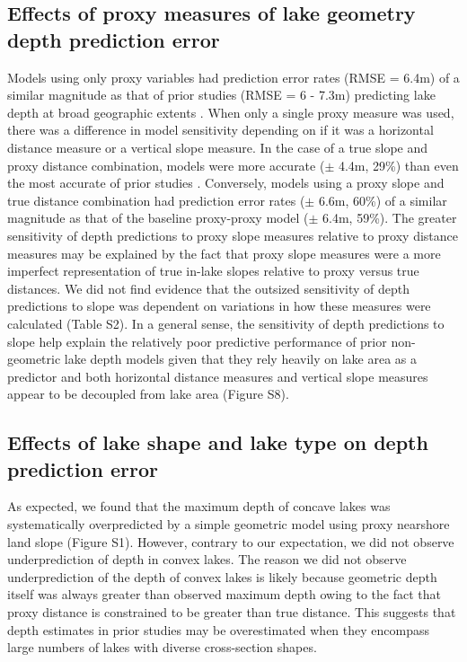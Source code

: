 \documentclass[draft]{agujournal2019}
\begin{document}
\subsection{Effects of proxy measures of lake geometry depth prediction error}
\noindent
Models using only proxy variables had prediction error rates (RMSE = 6.4m) of a similar magnitude as that of prior studies (RMSE = 6 - 7.3m) predicting lake depth at broad geographic extents \cite{hollisterPredictingMaximumLake2011, oliver2016prediction, messagerEstimatingVolumeAge2016}. When only a single proxy measure was used, there was a difference in model sensitivity depending on if it was a horizontal distance measure or a vertical slope measure. In the case of a true slope and proxy distance combination, models were more accurate ($\pm$ 4.4m, 29\%) than even the most accurate of prior studies \cite{hollisterPredictingMaximumLake2011, oliver2016prediction, messagerEstimatingVolumeAge2016}. Conversely, models using a proxy slope and true distance combination had prediction error rates ($\pm$ 6.6m, 60\%) of a similar magnitude as that of the baseline proxy-proxy model ($\pm$ 6.4m, 59\%). The greater sensitivity of depth predictions to proxy slope measures relative to proxy distance measures may be explained by the fact that proxy slope measures were a more imperfect representation of true in-lake slopes relative to proxy versus true distances. We did not find evidence that the outsized sensitivity of depth predictions to slope was dependent on variations in how these measures were calculated (Table S2). In a general sense, the sensitivity of depth predictions to slope help explain the relatively poor predictive performance of prior non-geometric lake depth models given that they rely heavily on lake area as a predictor \cite{messagerEstimatingVolumeAge2016, oliver2016prediction, sobekPredictingDepthVolume2011} and both horizontal distance measures and vertical slope measures appear to be decoupled from lake area (Figure S8).

\subsection{Effects of lake shape and lake type on depth prediction error}
\noindent
As expected, we found that the maximum depth of concave lakes was systematically overpredicted by a simple geometric model using proxy nearshore land slope (Figure S1). However, contrary to our expectation, we did not observe underprediction of depth in convex lakes. The reason we did not observe underprediction of the depth of convex lakes is likely because geometric depth itself was always greater than observed maximum depth owing to the fact that proxy distance is constrained to be greater than true distance. This suggests that depth estimates in prior studies may be overestimated when they encompass large numbers of lakes with diverse cross-section shapes.
\end{document}
